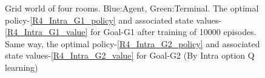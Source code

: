\documentclass[preprint,12pt]{elsarticle}
\begin{document}
\begin{figure}[H]
	\centering  
	\caption{Grid world of four rooms.  Blue:Agent, Green:Terminal. The optimal policy-\ref{R4_Intra_G1_policy} and associated state values-\ref{R4_Intra_G1_value} for Goal-G1 after training of 10000 episodes. Same way, the optimal policy-\ref{R4_Intra_G2_policy} and associated state values-\ref{R4_Intra_G2_value} for Goal-G2  (By Intra option Q learning)}
	\label{fig:R4_Intra}
\end{figure}
\end{document}
